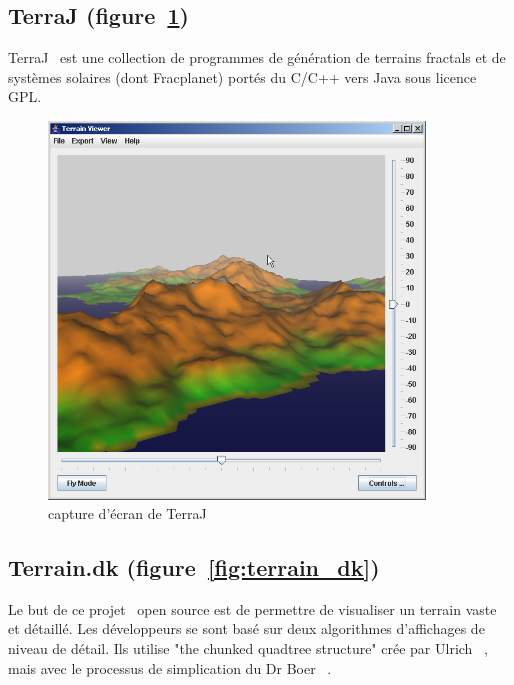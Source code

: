 \subsection{TerraJ (figure~\ref{fig:terraj})}
TerraJ~\cite{TerraJ} est une collection de programmes de génération de terrains fractals et de systèmes solaires (dont Fracplanet) portés du C/C++ vers Java sous licence GPL.

\begin{figure}[!ht]
    \begin{center}
        \includegraphics[width=10cm]{resources/terraj.png}
        \caption{capture d'écran de TerraJ}
        \label{fig:terraj}
    \end{center}
\end{figure}

\subsection{Terrain.dk (figure~\ref{fig:terrain_dk})}
Le but de ce projet~\cite{largeDetTerrainsURL} open source est de permettre de
visualiser un terrain vaste et détaillé. Les développeurs se sont basé sur deux algorithmes
d'affichages de niveau de détail. Ils utilise "the chunked quadtree structure"
crée par Ulrich ~\cite{Ulrich2002}, mais avec le processus de simplication du
Dr Boer ~\cite{citeulike:623420}.

